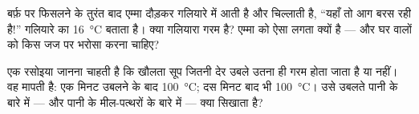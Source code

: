 \begin{exercise}[$\star\star$]\label{exo:g3:temperature-thermometers:10}
बर्फ़ पर फिसलने के तुरंत बाद एम्मा दौड़कर गलियारे में आती है और
चिल्लाती है, ``यहाँ तो आग बरस रही है!'' गलियारे का 
\qty{16}{\celsius} बताता है। क्या गलियारा गरम है? एम्मा को ऐसा लगता
क्यों है --- और घर वालों को किस जज पर भरोसा करना चाहिए?
\end{exercise}

\begin{exercise}[$\star\star$]\label{exo:g3:temperature-thermometers:11}
एक रसोइया जानना चाहती है कि खौलता सूप जितनी देर उबले उतना ही गरम
होता जाता है या नहीं। वह मापती है: एक मिनट उबलने के बाद
\qty{100}{\celsius}; दस मिनट बाद भी \qty{100}{\celsius}।  उसे
उबलते पानी के बारे में --- और पानी के मील-पत्थरों के बारे में ---
क्या सिखाता है?
\end{exercise}
